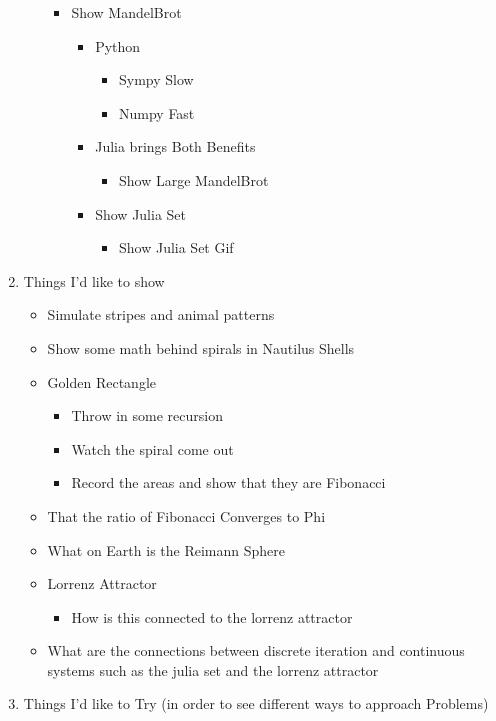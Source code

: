 \documentclass[11pt]{article}
\begin{document}
\begin{enumerate}
\begin{itemize}
\begin{itemize}
\item Show MandelBrot
\begin{itemize}
\item Python
\begin{itemize}
\item Sympy Slow
\item Numpy Fast
\end{itemize}
\item Julia brings Both Benefits
\begin{itemize}
\item Show Large MandelBrot
\end{itemize}
\item Show Julia Set
\begin{itemize}
\item Show Julia Set Gif
\end{itemize}
\end{itemize}
\end{itemize}
\end{itemize}
\item Things I'd like to show
\begin{itemize}
\item Simulate stripes and animal patterns
\item Show some math behind spirals in Nautilus Shells
\item Golden Rectangle
\begin{itemize}
\item Throw in some recursion
\item Watch the spiral come out
\item Record the areas and show that they are Fibonacci
\end{itemize}
\item That the ratio of Fibonacci Converges to Phi
\item What on Earth is the Reimann Sphere
\item Lorrenz Attractor
\begin{itemize}
\item How is this connected to the lorrenz attractor
\end{itemize}
\item What are the connections between discrete iteration and continuous systems such as the julia set and the lorrenz attractor
\end{itemize}
\item Things I'd like to Try (in order to see different ways to approach Problems)

\end{enumerate}
\end{document}

